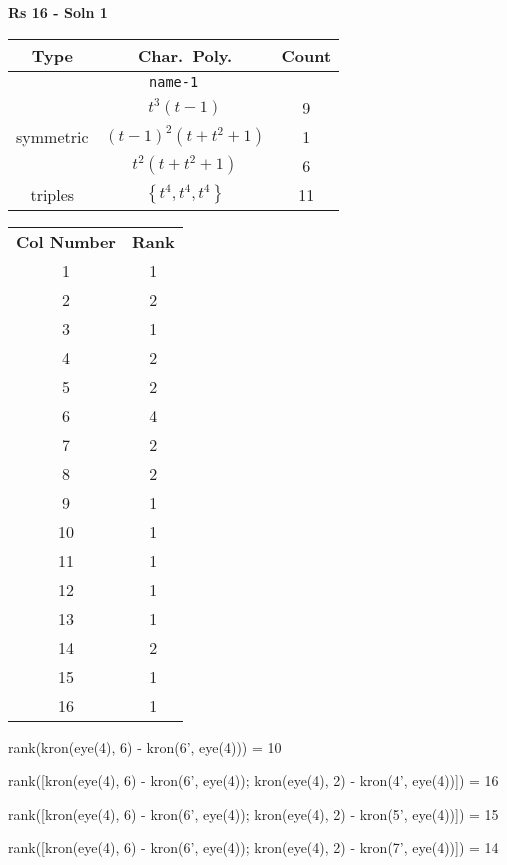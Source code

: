 \documentclass{article}
\begin{document}
    \textbf{Rs 16 - Soln 1}
    \begin{table}
    \begin{tabular}{|c|c|c|}
    \hline
    \textbf{Type} & \textbf{Char.~Poly.} & \textbf{Count} \\
    \hline \multicolumn{3}{|c|}{\texttt{name-1}} \\ \hline
    \multirow{3}{*}{symmetric}
    & $t^3(t - 1)$ & 9 \\
    & $(t - 1)^2(t + t^2 + 1)$ & 1 \\
    & $t^2(t + t^2 + 1)$ & 6 \\
    \hline
    \multirow{1}{*}{triples}
    & $\left\{t^4,t^4,t^4\right\}$ & 11 \\
    \hline
    \end{tabular}
    \end{table}
    \begin{table}
    \begin{tabular}{|c|c|}
    \hline
    \textbf{Col Number} & \textbf{Rank}\\
    1 & 1 \\ 
    2 & 2 \\ 
    3 & 1 \\ 
    4 & 2 \\ 
    5 & 2 \\ 
    6 & 4 \\ 
    7 & 2 \\ 
    8 & 2 \\ 
    9 & 1 \\ 
    10 & 1 \\ 
    11 & 1 \\ 
    12 & 1 \\ 
    13 & 1 \\ 
    14 & 2 \\ 
    15 & 1 \\ 
    16 & 1 \\ 
    \hline
    \end{tabular}
    \end{table}

    rank(kron(eye(4), 6) - kron(6', eye(4))) = 10

    rank([kron(eye(4), 6) - kron(6', eye(4)); kron(eye(4), 2) - kron(4', eye(4))]) = 16

    rank([kron(eye(4), 6) - kron(6', eye(4)); kron(eye(4), 2) - kron(5', eye(4))]) = 15
    
    rank([kron(eye(4), 6) - kron(6', eye(4)); kron(eye(4), 2) - kron(7', eye(4))]) = 14
    
\end{document}
